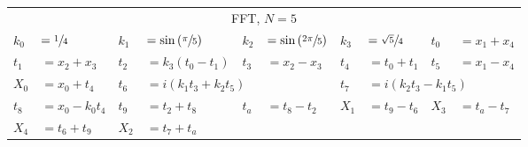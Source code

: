 \begin{tabular}{|p{4.3pt}l|p{4.3pt}l|p{4.3pt}l|p{4.3pt}l|p{4.3pt}l|}\toprule \multicolumn{10}{|c|}{FFT, $N=5$} \\
$k_0 $ &$= \sfrac{1}{4}$ & $k_1 $ &$= \sin\left(\sfrac{\pi}{5}\right)$ & $k_2 $ &$= \sin\left(\sfrac{2\pi}{5}\right)$ & $k_3 $ &$= \sfrac{\sqrt{5}}{4}$ & $t_0 $ &$= x_1 + x_4$\\ 
$t_1 $ &$= x_2 + x_3$ & $t_2 $ &$= k_3(t_0 - t_1)$ & $t_3 $ &$= x_2 - x_3$ & $t_4 $ &$= t_0 + t_1$ & $t_5 $ &$= x_1 - x_4$\\ 
$X_0 $ &$= x_0 + t_4$ & $t_6 $ &\multicolumn{3}{l|}{$= i(k_1t_3 + k_2t_5)$} & $t_7 $ &\multicolumn{3}{l|}{$= i(k_2t_3 - k_1t_5)$}\\ 
$t_8 $ &$= x_0 - k_0t_4$ & $t_9 $ &$= t_2 + t_8$ & $t_a $ &$= t_8 - t_2$ & $X_1 $ &$= t_9 - t_6$ & $X_3 $ &$= t_a - t_7$\\ 
$X_4 $ &$= t_6 + t_9$ & $X_2 $ &\multicolumn{7}{l|}{$= t_7 + t_a$}\\ 
\bottomrule\end{tabular}
